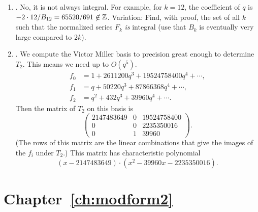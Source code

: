 \begin{enumerate}
\item {}.  
No, it is not always integral.
For example, for $k=12$, the coefficient of $q$
is $-2\cdot 12/B_{12} = 65520/691 \not\in\mathbb{Z}$.
Variation: Find, with proof, the set of all $k$ such that the normalized
series $F_k$ {\em is} integral (use that $B_k$ is eventually very
large compared to $2k$).

\item {}. 
We compute the Victor Miller basis to precision 
great enough to determine $T_2$. This means
we need up to $O(q^5)$. 
\begin{align*}
 f_0 &= 1 + 2611200q^{3} + 19524758400q^{4} + \cdots,\\
 f_1 &= q + 50220q^{3} + 87866368q^{4} +\cdots,\\
 f_2 &= q^{2} + 432q^{3} + 39960q^{4} + \cdots.
\end{align*}
Then the matrix of $T_2$ on this basis is 
$$
\left(\begin{array}{rrr}
2147483649&0&19524758400\\
0&0&2235350016\\
0&1&39960
\end{array}\right).
$$
(The rows of this matrix are the linear combinations that
give the images of the $f_i$ under $T_2$.)
This matrix has characteristic polynomial
$$
   (x - 2147483649) \cdot (x^{2} - 39960x - 2235350016).
$$


    
\end{enumerate}

\section{Chapter~\ref{ch:modform2}}

